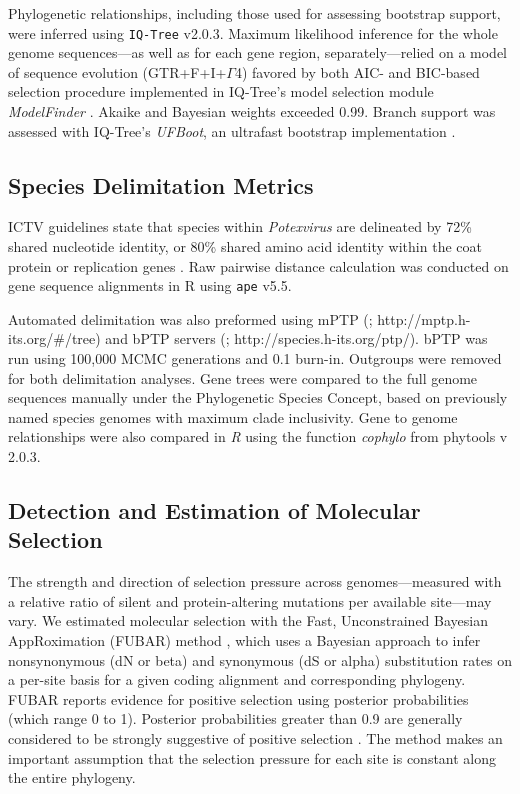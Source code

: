 \documentclass[fleqn,10pt,lineno]{wlpeerj}
\begin{document}
Phylogenetic relationships, including those used for assessing bootstrap support, were inferred using \texttt{IQ-Tree} v2.0.3. 
Maximum likelihood inference for the whole genome sequences---as well as for each gene region, separately---relied on a model of sequence evolution (GTR+F+I+$\Gamma$4) favored by both AIC- and BIC-based selection procedure implemented in IQ-Tree's model selection module {\em ModelFinder} \citep{kalyaanamoorthy2017}. 
Akaike and Bayesian weights exceeded 0.99. 
Branch support was assessed with IQ-Tree's {\em UFBoot}, an ultrafast bootstrap implementation \citep{hoang2018}.


\subsection*{Species Delimitation Metrics}
ICTV guidelines state that species within \textit{Potexvirus} are delineated by 72\% shared nucleotide identity, or 80\% shared amino acid identity within the coat protein or replication genes \citep{ICTV_potexviruses}.
Raw pairwise distance calculation was conducted on gene sequence alignments in R using \texttt{ape} v5.5.

Automated delimitation was also preformed using mPTP (\citealt{Kapli_2017}; http://mptp.h-its.org/\#/tree) and bPTP servers (\citealt{Zhang_2013}; http://species.h-its.org/ptp/). 
bPTP was run using 100,000 MCMC generations and 0.1 burn-in. 
Outgroups were removed for both delimitation analyses.
Gene trees were compared to the full genome sequences manually under the Phylogenetic Species Concept, based on previously named species genomes with maximum clade inclusivity.
Gene to genome relationships were also compared in \textit{R} using the function \textit{cophylo} from phytools v 2.0.3.


\subsection*{Detection and Estimation of Molecular Selection}

The strength and direction of selection pressure across genomes---measured with a relative ratio of silent and protein-altering mutations per available site---may vary. 
We estimated molecular selection with the Fast, Unconstrained Bayesian AppRoximation (FUBAR) method \citep{murrell2013}, which uses a Bayesian approach to infer nonsynonymous (dN or beta) and synonymous (dS or alpha) substitution rates on a per-site basis for a given coding alignment and corresponding phylogeny. 
FUBAR reports evidence for positive selection using posterior probabilities (which range 0 to 1).
Posterior probabilities greater than 0.9 are generally considered to be strongly suggestive of positive selection \citep{murrell2013}.
The method makes an important assumption that the selection pressure for each site is constant along the entire phylogeny.
\end{document}
